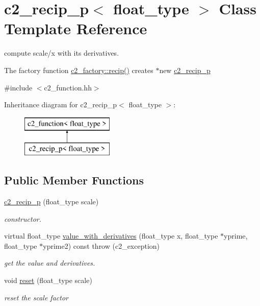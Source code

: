 \hypertarget{classc2__recip__p}{\section{c2\-\_\-recip\-\_\-p$<$ float\-\_\-type $>$ Class Template Reference}
\label{classc2__recip__p}
}


compute scale/x with its derivatives.

The factory function \hyperlink{classc2__factory_adda01279d6b1059843e2aecc5be5d95e}{c2\-\_\-factory\-::recip()} creates $\ast$new \hyperlink{classc2__recip__p}{c2\-\_\-recip\-\_\-p}  




{\ttfamily \#include $<$c2\-\_\-function.\-hh$>$}

Inheritance diagram for c2\-\_\-recip\-\_\-p$<$ float\-\_\-type $>$\-:\begin{figure}[H]
\begin{center}
\leavevmode
\includegraphics[height=2.000000cm]{classc2__recip__p}
\end{center}
\end{figure}
\subsection*{Public Member Functions}
\begin{DoxyCompactItemize}
\item 
\hypertarget{classc2__recip__p_adb65d13c2bd17517ca734f0d336a281f}{\hyperlink{classc2__recip__p_adb65d13c2bd17517ca734f0d336a281f}{c2\-\_\-recip\-\_\-p} (float\-\_\-type scale)}\label{classc2__recip__p_adb65d13c2bd17517ca734f0d336a281f}

\begin{DoxyCompactList}\small\item\em constructor. \end{DoxyCompactList}\item 
virtual float\-\_\-type \hyperlink{classc2__recip__p_a0f05f680a8074a14c6d2ed5f5e1ebeca}{value\-\_\-with\-\_\-derivatives} (float\-\_\-type x, float\-\_\-type $\ast$yprime, float\-\_\-type $\ast$yprime2) const   throw (c2\-\_\-exception)
\begin{DoxyCompactList}\small\item\em get the value and derivatives. \end{DoxyCompactList}\item 
void \hyperlink{classc2__recip__p_a94758675f4ec349d45b4449a8e51dbbd}{reset} (float\-\_\-type scale)
\begin{DoxyCompactList}\small\item\em reset the scale factor \end{DoxyCompactList}\end{DoxyCompactItemize}
